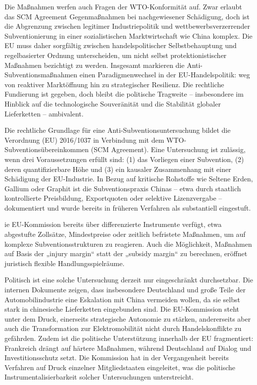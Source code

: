 \documentclass[12pt,a4paper,oneside]{book} %
\begin{document}
Die Maßnahmen werfen auch Fragen der WTO-Konformität auf. Zwar erlaubt das SCM Agreement Gegenmaßnahmen bei nachgewiesener Schädigung, doch ist die Abgrenzung zwischen legitimer Industriepolitik und wettbewerbsverzerrender Subventionierung in einer sozialistischen Marktwirtschaft wie China komplex. Die EU muss daher sorgfältig zwischen handelspolitischer Selbstbehauptung und regelbasierter Ordnung unterscheiden, um nicht selbst protektionistischer Maßnahmen bezichtigt zu werden.
Insgesamt markieren die Anti-Subventionsmaßnahmen einen Paradigmenwechsel in der EU-Handelspolitik: weg von reaktiver Marktöffnung hin zu strategischer Resilienz. Die rechtliche Fundierung ist gegeben, doch bleibt die politische Tragweite – insbesondere im Hinblick auf die technologische Souveränität und die Stabilität globaler Lieferketten – ambivalent.

Die rechtliche Grundlage für eine Anti-Subventionsuntersuchung bildet die Verordnung (EU) 2016/1037 in Verbindung mit dem WTO-Subventionsübereinkommen (SCM Agreement). Eine Untersuchung ist zulässig, wenn drei Voraussetzungen erfüllt sind: (1) das Vorliegen einer Subvention, (2) deren quantifizierbare Höhe und (3) ein kausaler Zusammenhang mit einer Schädigung der EU-Industrie. In Bezug auf kritische Rohstoffe wie Seltene Erden, Gallium oder Graphit ist die Subventionspraxis Chinas – etwa durch staatlich kontrollierte Preisbildung, Exportquoten oder selektive Lizenzvergabe – dokumentiert und wurde bereits in früheren Verfahren als substantiell eingestuft.

ie EU-Kommission bereits über differenzierte Instrumente verfügt, etwa abgestufte Zollsätze, Mindestpreise oder zeitlich befristete Maßnahmen, um auf komplexe Subventionsstrukturen zu reagieren. Auch die Möglichkeit, Maßnahmen auf Basis der „injury margin“ statt der „subsidy margin“ zu berechnen, eröffnet juristisch flexible Handlungsspielräume.

Politisch ist eine solche Untersuchung derzeit nur eingeschränkt durchsetzbar. Die internen Dokumente zeigen, dass insbesondere Deutschland und große Teile der Automobilindustrie eine Eskalation mit China vermeiden wollen, da sie selbst stark in chinesische Lieferketten eingebunden sind. Die EU-Kommission steht unter dem Druck, einerseits strategische Autonomie zu stärken, andererseits aber auch die Transformation zur Elektromobilität nicht durch Handelskonflikte zu gefährden. Zudem ist die politische Unterstützung innerhalb der EU fragmentiert: Frankreich drängt auf härtere Maßnahmen, während Deutschland auf Dialog und Investitionsschutz setzt. Die Kommission hat in der Vergangenheit bereits Verfahren auf Druck einzelner Mitgliedstaaten eingeleitet, was die politische Instrumentalisierbarkeit solcher Untersuchungen unterstreicht.
\end{document}
